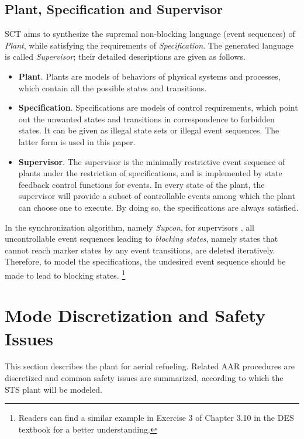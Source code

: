 \subsection{Plant, Specification and Supervisor}
\label{sec:pss}
SCT aims to synthesize the supremal non-blocking language (event sequences) of \textit{Plant}, while satisfying the requirements of \textit{Specification}. The generated language is called \textit{Supervisor}; their detailed descriptions are given as follows.
\begin{itemize}
	\item \textbf{Plant}. Plants are models of behaviors of physical systems and processes, which contain all the possible states and transitions. 
	\item \textbf{Specification}. Specifications are models of control requirements, which point out the unwanted states and transitions in correspondence to forbidden states. It can be given as illegal state sets\cite{Markovski2010Coordination} or illegal event sequences\cite{Forschelen2012Application}. The latter form is used in this paper.
	\item \textbf{Supervisor}. The supervisor is the minimally restrictive event sequence of plants under the restriction of specifications, and is implemented by state feedback control functions \cite{ma2006nonblocking} for events. In every state of the plant, the supervisor will provide a subset of controllable events among which the plant can choose one to execute. By doing so, the specifications are always satisfied.
\end{itemize}

In the synchronization algorithm, namely \textit{Supcon}, for supervisors \cite{ma2006nonblocking}, all uncontrollable event sequences leading to \textit{blocking states}, namely states that cannot reach marker states by any event transitions, are deleted iteratively. Therefore, to model the specifications, the undesired event sequence should be made to lead to blocking states. \footnote{Readers can find a similar example in Exercise 3 of Chapter 3.10 in the DES textbook \cite{wonham2015supervisory} for a better understanding.}

\section{Mode Discretization and Safety Issues}
\label{sec:mode}
This section describes the plant for aerial refueling. Related AAR procedures are discretized and common safety issues are summarized, according to which the STS plant will be modeled. 


